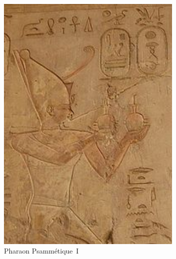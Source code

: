 \begin{minipage}[H]{0.32\linewidth}
  \begin{figure}[H]
  \centering
  \includegraphics[width=0.8\textwidth]{../resources/illustrations/psamtik-I}
  \caption{Pharaon Psammétique~I}
  \end{figure}
\end{minipage}
